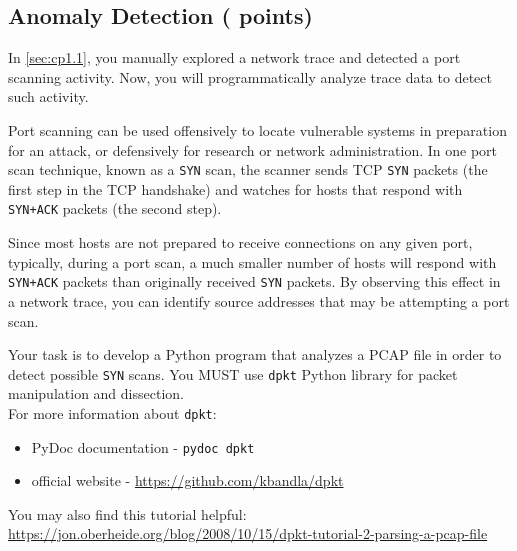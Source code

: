 \newpage

\subsection{Anomaly Detection ( points)}
\label{sec:cp2.2}
\newcommand{\fileanomaly}{\ref*{sec:cp2.2}.py}

In \ref{sec:cp1.1}, you manually explored a network trace and detected a port scanning activity.
Now, you will programmatically analyze trace data to detect such activity.

\medskip

Port scanning can be used offensively to locate vulnerable systems in preparation for an attack, or defensively for research or network administration.
In one port scan technique, known as a \texttt{SYN} scan, the scanner sends TCP \texttt{SYN} packets (the first step in the TCP handshake) and watches for hosts that respond with \texttt{SYN+ACK} packets (the second step).

\medskip

Since most hosts are not prepared to receive connections on any given port, typically, during a port scan, a much smaller number of hosts will respond with \texttt{SYN+ACK} packets than originally received \texttt{SYN} packets.
By observing this effect in a network trace, you can identify source addresses that may be attempting a port scan.

\medskip

Your task is to develop a Python program that analyzes a PCAP file in order to detect possible \texttt{SYN} scans.
You MUST use \texttt{dpkt} Python library for packet manipulation and dissection.\\
For more information about \texttt{dpkt}:
\begin{itemize}[nosep]
  \item PyDoc documentation - \texttt{pydoc dpkt}
  \item official website - \url{https://github.com/kbandla/dpkt}
\end{itemize}
You may also find this tutorial helpful:\\
\url{https://jon.oberheide.org/blog/2008/10/15/dpkt-tutorial-2-parsing-a-pcap-file}

\medskip

